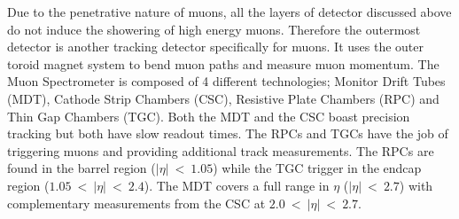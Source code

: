 		Due to the penetrative nature of muons, all the layers of detector discussed above do not induce the showering of high energy muons. Therefore the outermost detector is another tracking detector specifically for muons. It uses the outer toroid magnet system to bend muon paths and measure muon momentum. The Muon Spectrometer is composed of 4 different technologies; Monitor Drift Tubes (MDT), Cathode Strip Chambers (CSC), Resistive Plate Chambers (RPC) and Thin Gap Chambers (TGC). Both the MDT and the CSC boast precision tracking but both have slow readout times. The RPCs and TGCs have the job of triggering muons and providing additional track measurements. The RPCs are found in the barrel region ($|\eta|~<~1.05$) while the TGC trigger in the endcap region ($1.05~<~|\eta|~<~2.4$). The MDT covers a full range in $\eta$ ($|\eta|~<~2.7$) with complementary measurements from the CSC at $2.0~<~|\eta|~<~2.7$.\\



